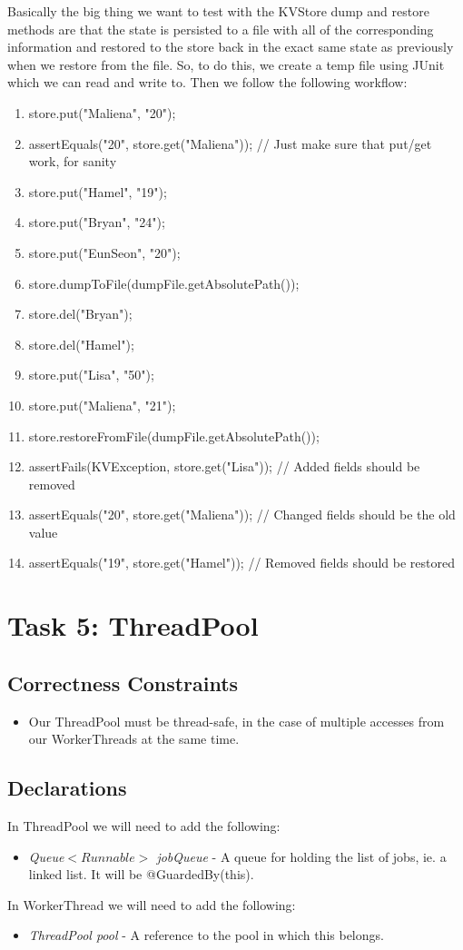 \documentclass{article}
\begin{document}
Basically the big thing we want to test with the KVStore dump and restore methods are that the state is persisted to a
file with all of the corresponding information and restored to the store back in the exact same state as previously when
we restore from the file. So, to do this, we create a temp file using JUnit which we can read and write to. Then we
follow the following workflow:
\begin{enumerate}
\item store.put("Maliena", "20");
\item assertEquals("20", store.get("Maliena")); // Just make sure that put/get work, for sanity
\item store.put("Hamel", "19");
\item store.put("Bryan", "24");
\item store.put("EunSeon", "20");
\item store.dumpToFile(dumpFile.getAbsolutePath());
\item store.del("Bryan");
\item store.del("Hamel");
\item store.put("Lisa", "50");
\item store.put("Maliena", "21");
\item store.restoreFromFile(dumpFile.getAbsolutePath());
\item assertFails(KVException, store.get("Lisa")); // Added fields should be removed
\item assertEquals("20", store.get("Maliena")); // Changed fields should be the old value
\item assertEquals("19", store.get("Hamel")); // Removed fields should be restored
\end{enumerate}

\section*{Task 5: ThreadPool}
\subsection*{Correctness Constraints}
\begin{itemize}
\item Our ThreadPool must be thread-safe, in the case of multiple accesses from our WorkerThreads at the same time.
\end{itemize}

\subsection*{Declarations}
In ThreadPool we will need to add the following:
\begin{itemize}
\item \textit{Queue$<Runnable>$ jobQueue} - A queue for holding the list of jobs, ie. a linked list. It will
be @GuardedBy(this).
\end{itemize}
In WorkerThread we will need to add the following:
\begin{itemize}
\item \textit{ThreadPool pool} - A reference to the pool in which this belongs.
\end{itemize}
\end{document}
